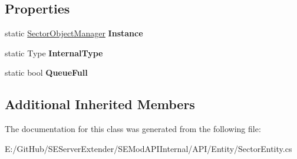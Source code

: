 \subsection*{Properties}
\begin{DoxyCompactItemize}
\item 
\hypertarget{class_s_e_mod_a_p_i_internal_1_1_a_p_i_1_1_entity_1_1_sector_object_manager_a8e818d37c83b762dc6ea9b85d7c71f4f}{}static \hyperlink{class_s_e_mod_a_p_i_internal_1_1_a_p_i_1_1_entity_1_1_sector_object_manager}{Sector\+Object\+Manager} {\bfseries Instance}\label{class_s_e_mod_a_p_i_internal_1_1_a_p_i_1_1_entity_1_1_sector_object_manager_a8e818d37c83b762dc6ea9b85d7c71f4f}

\item 
\hypertarget{class_s_e_mod_a_p_i_internal_1_1_a_p_i_1_1_entity_1_1_sector_object_manager_aef405407f592a3a24d474f3292a51167}{}static Type {\bfseries Internal\+Type}\label{class_s_e_mod_a_p_i_internal_1_1_a_p_i_1_1_entity_1_1_sector_object_manager_aef405407f592a3a24d474f3292a51167}

\item 
\hypertarget{class_s_e_mod_a_p_i_internal_1_1_a_p_i_1_1_entity_1_1_sector_object_manager_a374841d6e0b16243147596f8ed3a4ff1}{}static bool {\bfseries Queue\+Full}\label{class_s_e_mod_a_p_i_internal_1_1_a_p_i_1_1_entity_1_1_sector_object_manager_a374841d6e0b16243147596f8ed3a4ff1}

\end{DoxyCompactItemize}
\subsection*{Additional Inherited Members}


The documentation for this class was generated from the following file\+:\begin{DoxyCompactItemize}
\item 
E\+:/\+Git\+Hub/\+S\+E\+Server\+Extender/\+S\+E\+Mod\+A\+P\+I\+Internal/\+A\+P\+I/\+Entity/Sector\+Entity.\+cs\end{DoxyCompactItemize}
